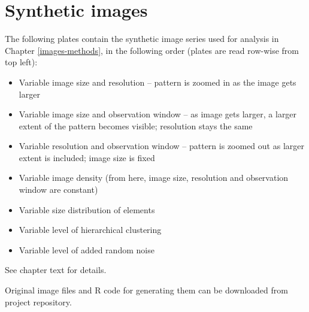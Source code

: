 \documentclass[
  12pt,
  a4paper, twoside]{book}
\begin{document}
\hypertarget{append-synth}{%
\chapter{Synthetic images}\label{append-synth}}

The following plates contain the synthetic image series used for analysis in Chapter \ref{images-methods}, in the following order (plates are read row-wise from top left):

\begin{itemize}
\item
  Variable image size and resolution -- pattern is zoomed in as the image gets larger
\item
  Variable image size and observation window -- as image gets larger, a larger extent of the pattern becomes visible; resolution stays the same
\item
  Variable resolution and observation window -- pattern is zoomed out as larger extent is included; image size is fixed
\item
  Variable image density (from here, image size, resolution and observation window are constant)
\item
  Variable size distribution of elements
\item
  Variable level of hierarchical clustering
\item
  Variable level of added random noise
\end{itemize}

See chapter text for details.

Original image files and R code for generating them can be downloaded from project repository.

\newpage
\end{document}
